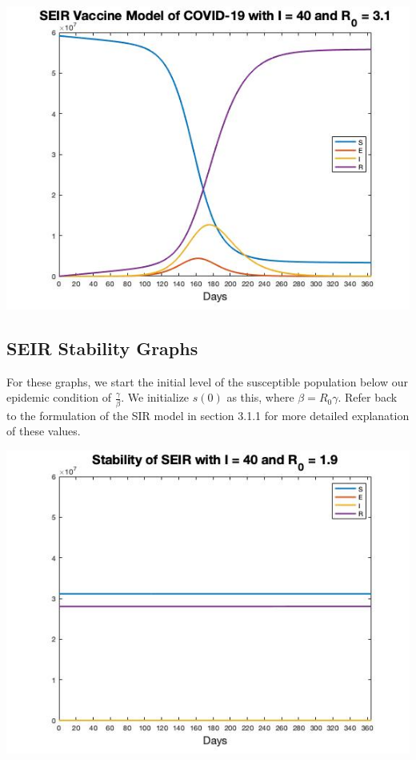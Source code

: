 \documentclass[12pt, a4paper]{article}
\begin{document}
    \includegraphics[scale=0.75]{plots/i40r31_seir_vac.jpg}
    
    \subsection{SEIR Stability Graphs}
    
    For these graphs, we start the initial level of the susceptible population below our epidemic condition of $\frac{\gamma}{\beta}$. We initialize $s(0)$ as this, where $\beta=R_0\gamma$. Refer back to the formulation of the SIR model in section 3.1.1 for more detailed explanation of these values.
    
    
    
    
    \includegraphics[scale=0.75]{plots/i40r19_st.jpg}
    
\end{document}
